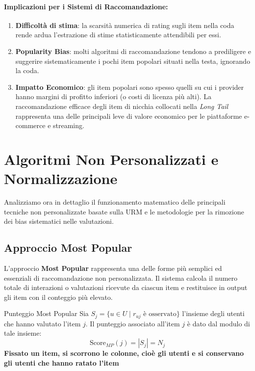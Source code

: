 \paragraph{Implicazioni per i Sistemi di Raccomandazione:}
\begin{enumerate}
    \item \textbf{Difficoltà di stima}: la scarsità numerica di rating sugli item nella coda rende ardua l'estrazione di stime statisticamente attendibili per essi.
    \item \textbf{Popularity Bias}: molti algoritmi di raccomandazione tendono a prediligere e suggerire sistematicamente i pochi item popolari situati nella testa, ignorando la coda.
    \item \textbf{Impatto Economico}: gli item popolari sono spesso quelli su cui i provider hanno margini di profitto inferiori (o costi di licenza più alti). La raccomandazione efficace degli item di nicchia collocati nella \textit{Long Tail} rappresenta una delle principali leve di valore economico per le piattaforme e-commerce e streaming.
\end{enumerate}


\section{Algoritmi Non Personalizzati e Normalizzazione}

Analizziamo ora in dettaglio il funzionamento matematico delle principali tecniche non personalizzate basate sulla URM e le metodologie per la rimozione dei bias sistematici nelle valutazioni.

\subsection{Approccio Most Popular}
L'approccio \textbf{Most Popular} rappresenta una delle forme più semplici ed essenziali di raccomandazione non personalizzata. Il sistema calcola il numero totale di interazioni o valutazioni ricevute da ciascun item e restituisce in output gli item con il conteggio più elevato.

\begin{definition}{Punteggio Most Popular}
Sia $S_j = \{u \in U \mid r_{uj} \text{ è osservato}\}$ l'insieme degli utenti che hanno valutato l'item $j$. Il punteggio associato all'item $j$ è dato dal modulo di tale insieme:
\[
\text{Score}_{MP}(j) = |S_j| = N_j
\]
\textbf{Fissato un item, si scorrono le colonne, cioè gli utenti e si conservano gli utenti che hanno ratato l'item}
\end{definition}

